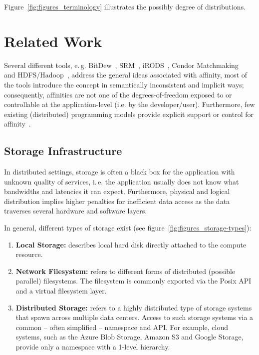 \documentclass[conference]{IEEEtran}
\begin{document}
Figure~\ref{fig:figures_terminology} illustrates the possibly degree of 
distributions.


\section{Related Work}

Several different tools, e.\,g.
BitDew~\cite{Fedak:2008:BPE:1413370.1413416}, SRM~\cite{srm-ogf},
iRODS~\cite{Rajasekar:2010:IPI:1855046}, Condor
Matchmaking~\cite{Raman:1998:MDR:822083.823222} and
HDFS/Hadoop~\cite{hadoop}, address the general ideas associated with
affinity, most of the tools introduce the concept in semantically
inconsistent and implicit ways; consequently, affinities are not one
of the degrees-of-freedom exposed to or controllable at the
application-level (i.e.  by the developer/user). Furthermore, few
existing (distributed) programming models provide explicit support or
control for affinity~\cite{ideas}.



\subsection{Storage Infrastructure}

In distributed settings, storage is often a black box for the application with
unknown quality of services, i.\,e. the application usually does not know what
bandwidths and latencies it can expect. Furthermore, physical and logical
distribution implies higher penalties for inefficient data access as the data
traverses several hardware and software layers.


In general, different types of storage exist (see 
figure~\ref{fig:figures_storage-types}):

\begin{enumerate}
	\item \textbf{Local Storage:} describes local hard disk directly attached 
	to the compute resource.
	\item \textbf{Network Filesystem:} refers to different forms of 
	distributed (possible parallel) filesystems. The filesystem is commonly 
	exported via the Posix API and a virtual filesystem layer.
	\item \textbf{Distributed Storage:} refers to a highly distributed type of 
	storage systems that spawn across multiple data centers. Access to such 
	storage systems via a common -- often simplified -- namespace and API. For 
	example, cloud systems, such as the Azure Blob Storage, Amazon S3 and 
	Google Storage, provide only a namespace with a 1-level hierarchy. 
\end{enumerate}
\end{document}
